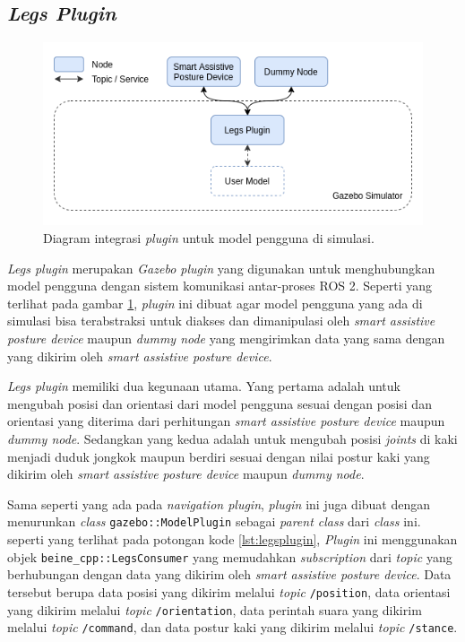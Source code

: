 \subsection{\emph{Legs Plugin}}
\label{subsec:legsplugin}

\begin{figure}[ht]
  \centering
  \includegraphics[scale=0.5]{gambar/integrasi-plugin-pengguna.png}
  \caption{Diagram integrasi \emph{plugin} untuk model pengguna di simulasi.}
  \label{fig:integrasipluginpengguna}
\end{figure}

\emph{Legs plugin} merupakan \emph{Gazebo plugin} yang digunakan untuk menghubungkan model pengguna dengan sistem komunikasi antar-proses ROS 2.
Seperti yang terlihat pada gambar \ref{fig:integrasipluginpengguna},
  \emph{plugin} ini dibuat agar model pengguna yang ada di simulasi bisa terabstraksi untuk diakses dan dimanipulasi oleh \emph{smart assistive posture device} maupun \emph{dummy node} yang mengirimkan data yang sama dengan yang dikirim oleh \emph{smart assistive posture device}.



\emph{Legs plugin} memiliki dua kegunaan utama.
Yang pertama adalah untuk mengubah posisi dan orientasi dari model pengguna sesuai dengan posisi dan orientasi yang diterima dari perhitungan \emph{smart assistive posture device} maupun \emph{dummy node}.
Sedangkan yang kedua adalah untuk mengubah posisi \emph{joints} di kaki menjadi duduk jongkok maupun berdiri sesuai dengan nilai postur kaki yang dikirim oleh \emph{smart assistive posture device} maupun \emph{dummy node}.

Sama seperti yang ada pada \emph{navigation plugin},
  \emph{plugin} ini juga dibuat dengan menurunkan \emph{class} \lstinline{gazebo::ModelPlugin} sebagai \emph{parent class} dari \emph{class} ini.
seperti yang terlihat pada potongan kode \ref{lst:legsplugin},
  \emph{Plugin} ini menggunakan objek \lstinline{beine_cpp::LegsConsumer} yang memudahkan \emph{subscription} dari \emph{topic} yang berhubungan dengan data yang dikirim oleh \emph{smart assistive posture device}.
Data tersebut berupa data posisi yang dikirim melalui \emph{topic} \lstinline{/position},
  data orientasi yang dikirim melalui \emph{topic} \lstinline{/orientation},
  data perintah suara yang dikirim melalui \emph{topic} \lstinline{/command},
  dan data postur kaki yang dikirim melalui \emph{topic} \lstinline{/stance}.

